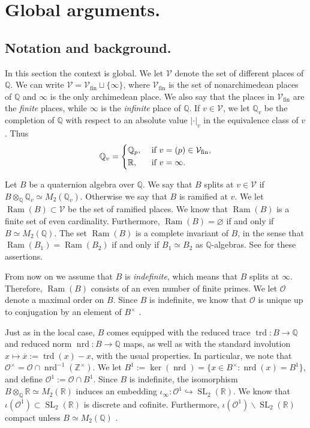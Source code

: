 \documentclass{article}
\theoremstyle{named}
\newcommand{\Z}{\mathbb{Z}}
\newcommand{\Q}{\mathbb{Q}}
\newcommand{\R}{\mathbb{R}}
\renewcommand{\O}{\mathcal{O}}
\newcommand{\Pl}{\mathcal{V}}
\newcommand{\Primes}{\mathcal{V}_{\text{fin}}}
\DeclareMathOperator{\SL}{SL}
\DeclareMathOperator{\Ram}{Ram}
\DeclareMathOperator{\nrd}{nrd}
\DeclareMathOperator{\trd}{trd}
\begin{document}
\section{Global arguments.}\label{sec:globalarguments}
\subsection{Notation and background.}
In this section the context is global. We let $\Pl$ denote the set of different places of $\Q$. We can write $\Pl = \Primes \sqcup \{\infty\}$, where $\Primes$ is the set of nonarchimedean places of $\Q$ and $\infty$ is the only archimedean place. We also say that the places in $\Primes$ are the \emph{finite} places, while $\infty$ is the \emph{infinite} place of $\Q$. If $v \in \Pl$, we let $\Q_v$ be the completion of $\Q$ with respect to an absolute value $|\cdot|_v$ in the equivalence class of $v$. Thus
\begin{equation*}
    \Q_v = \begin{dcases}
        \Q_p, & \text{ if }v = (p) \in \Primes,\\
        \R, & \text{ if }v = \infty.
    \end{dcases}
\end{equation*}

Let $B$ be a quaternion algebra over $\Q$. We say that $B$ splits at $v \in \Pl$ if $B\otimes_\Q \Q_v \simeq M_2(\Q_v)$. Otherwise we say that $B$ is ramified at $v$. We let $\Ram(B) \subset \Pl$ be the set of ramified places. We know that $\Ram(B)$ is a finite set of even cardinality. Furthermore, $\Ram(B) = \varnothing$ if and only if $B \simeq M_2(\Q)$. The set $\Ram(B)$ is a complete invariant of $B$, in the sense that $\Ram(B_1) = \Ram(B_2)$ if and only if $B_1 \simeq B_2$ as $\Q$-algebras. See \cite[Main Theorem 14.6.1]{voight} for these assertions.

From now on we assume that $B$ is \emph{indefinite}, which means that $B$ splits at $\infty$. Therefore, $\Ram(B)$ consists of an even number of finite primes. We let $\O$ denote a maximal order on $B$. Since $B$ is indefinite, we know that $\O$ is unique up to conjugation by an element of $B^\times$ \cite[Corollary 28.5.10]{voight}.

Just as in the local case, $B$ comes equipped with the reduced trace $\trd: B \rightarrow \Q$ and reduced norm $\nrd: B\rightarrow \Q$ maps, as well as with the standard involution $x \mapsto \overline{x}:= \trd(x) - x$, with the usual properties. In particular, we note that $\O^\times = \O \cap \nrd^{-1}(\Z^\times)$. We let $B^1 := \ker(\nrd) = \{x \in B^\times : \nrd(x) = B^1\}$, and define $\O^1 := \O \cap B^1$. Since $B$ is indefinite, the isomorphism $B \otimes_\Q \R \simeq M_2(\R)$ induces an embedding $\iota_\infty: \O^1 \hookrightarrow \SL_2(\R)$. We know that $\iota(\O^1) \subset \SL_2(\R)$ is discrete and cofinite. Furthermore, $\iota(\O^1)\backslash \SL_2(\R)$ compact unless $B \simeq M_2(\Q)$ \cite[Theorem 38.1.3]{voight}.
\end{document}
